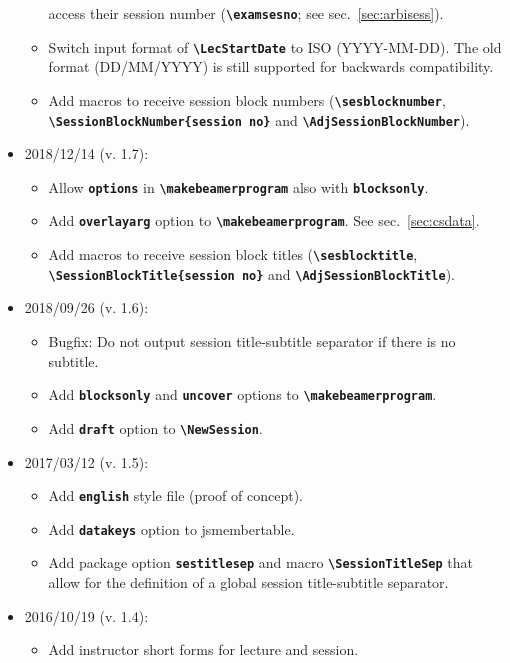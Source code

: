 \documentclass[english]{article}
\newcommand*\jmacro[1]{\textbf{\texttt{#1}}}
\newcommand*\jcsmacro[1]{\jmacro{\textbackslash{#1}}}
\newcommand*\joption[1]{\textbf{\texttt{#1}}}
\newcommand*\jparam[1]{\angus #1\angud}
\newcommand*\jsmt{\textsf{jsmembertable}}
\begin{document}
\begin{itemize}
\begin{itemize}
		      access their session number (\jcsmacro{examsesno}; see sec.~\ref{sec:arbisess}).
		\item Switch input format of \jcsmacro{LecStartDate} to ISO (YYYY-MM-DD). The old format
		      (DD/MM/YYYY) is still supported for backwards compatibility.
		\item Add macros to receive session block numbers (\jcsmacro{sesblocknumber},\\
		      \jcsmacro{SessionBlockNumber\{\jparam{session no}\}} and \jcsmacro{AdjSessionBlockNumber}).
	\end{itemize}
\item 2018/12/14 (v. 1.7):
	\begin{itemize}
		\item Allow \joption{options} in \jcsmacro{makebeamerprogram} also with \joption{blocksonly}.
		\item Add \joption{overlayarg} option to \jcsmacro{makebeamerprogram}. See sec.~\ref{sec:csdata}.
		\item Add macros to receive session block titles (\jcsmacro{sesblocktitle},\\
		      \jcsmacro{SessionBlockTitle\{\jparam{session no}\}} and \jcsmacro{AdjSessionBlockTitle}).
	\end{itemize}
\item 2018/09/26 (v. 1.6):
	\begin{itemize}
	    \item Bugfix: Do not output session title-subtitle separator if there is no	subtitle.
	    \item Add \joption{blocksonly} and \joption{uncover} options to \jcsmacro{makebeamerprogram}.
	    \item Add \joption{draft} option to \jcsmacro{NewSession}.
    \end{itemize}
\item 2017/03/12 (v. 1.5):
	\begin{itemize}
		\item Add \joption{english} style file (proof of concept).
		\item Add \joption{datakeys} option to \jsmt.
		\item Add package option \joption{sestitlesep} and macro \jcsmacro{SessionTitleSep} that
		allow for the definition of a global session title-subtitle	separator.
	\end{itemize}
\item 2016/10/19 (v. 1.4):
	\begin{itemize}
		\item Add instructor short forms for lecture and session.

\end{itemize}
\end{itemize}
\end{document}
